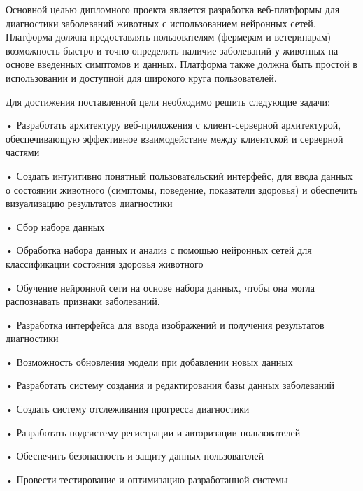 {\gostFont

  \par \redline Основной целью дипломного проекта является разработка веб-платформы для диагностики заболеваний животных с использованием нейронных сетей. Платформа должна предоставлять пользователям (фермерам и ветеринарам) возможность быстро и точно определять наличие заболеваний у животных на основе введенных симптомов и данных. Платформа также должна быть простой в использовании и доступной для широкого круга пользователей.

  \par \redline Для достижения поставленной цели необходимо решить следующие задачи:

  \par \redline • Разработать архитектуру веб-приложения с клиент-серверной архитектурой, обеспечивающую эффективное взаимодействие между клиентской и серверной частями
  \par \redline • Создать интуитивно понятный пользовательский интерфейс, для ввода данных о состоянии животного (симптомы, поведение, показатели здоровья) и обеспечить визуализацию результатов диагностики
  \par \redline • Сбор набора данных
  \par \redline • Обработка набора данных и анализ с помощью нейронных сетей для классификации состояния здоровья животного
  \par \redline • Обучение нейронной сети на основе набора данных, чтобы она могла распознавать признаки заболеваний.
  \par \redline • Разработка интерфейса для ввода изображений и получения результатов диагностики
  \par \redline • Возможность обновления модели при добавлении новых данных
  \par \redline • Разработать систему создания и редактирования базы данных заболеваний
  \par \redline • Создать систему отслеживания прогресса диагностики
  \par \redline • Разработать подсистему регистрации и авторизации пользователей
  \par \redline • Обеспечить безопасность и защиту данных пользователей
  \par \redline • Провести тестирование и оптимизацию разработанной системы

  \par
}

\subtitlespace

